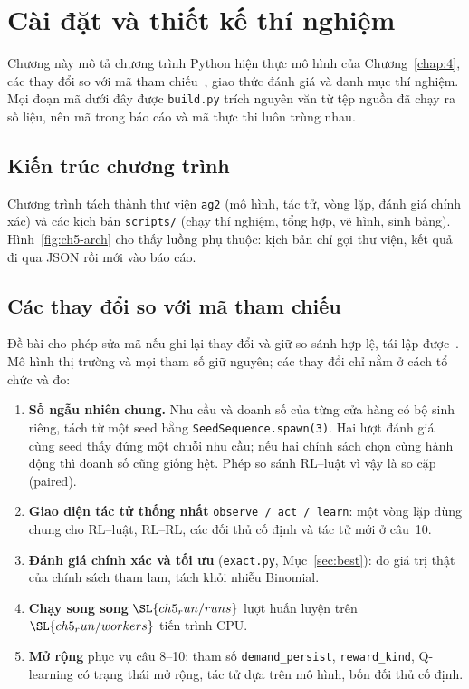 \chapter{Cài đặt và thiết kế thí nghiệm}\label{chap:5}

Chương này mô tả chương trình Python hiện thực mô hình của Chương~\ref{chap:4}, các thay đổi so với mã tham
chiếu~\cite{lab02code}, giao thức đánh giá và danh mục thí nghiệm. Mọi đoạn mã dưới đây được \texttt{build.py} trích
nguyên văn từ tệp nguồn đã chạy ra số liệu, nên mã trong báo cáo và mã thực thi luôn trùng nhau.

\section{Kiến trúc chương trình}

Chương trình tách thành thư viện \texttt{ag2} (mô hình, tác tử, vòng lặp, đánh giá chính xác) và các kịch bản
\texttt{scripts/} (chạy thí nghiệm, tổng hợp, vẽ hình, sinh bảng). Hình~\ref{fig:ch5-arch} cho thấy luồng phụ thuộc:
kịch bản chỉ gọi thư viện, kết quả đi qua JSON rồi mới vào báo cáo.


\section{Các thay đổi so với mã tham chiếu}

Đề bài cho phép sửa mã nếu ghi lại thay đổi và giữ so sánh hợp lệ, tái lập được~\cite{lab02}. Mô hình thị trường và
mọi tham số giữ nguyên; các thay đổi chỉ nằm ở cách tổ chức và đo:
\begin{enumerate}
  \item[\textbf{M1.}] \textbf{Số ngẫu nhiên chung.} Nhu cầu và doanh số của từng cửa hàng có bộ sinh riêng, tách từ một seed
    bằng \texttt{SeedSequence.spawn(3)}. Hai lượt đánh giá cùng seed thấy đúng một chuỗi nhu cầu; nếu hai chính sách chọn
    cùng hành động thì doanh số cũng giống hệt. Phép so sánh RL--luật vì vậy là so cặp (paired).
  \item[\textbf{M2.}] \textbf{Giao diện tác tử thống nhất} \texttt{observe / act / learn}: một vòng lặp dùng chung cho
    RL--luật, RL--RL, các đối thủ cố định và tác tử mới ở câu~10.
  \item[\textbf{M3.}] \textbf{Đánh giá chính xác và tối ưu} (\texttt{exact.py}, Mục~\ref{sec:best}): đo giá trị thật của
    chính sách tham lam, tách khỏi nhiễu Binomial.
  \item[\textbf{M4.}] \textbf{Chạy song song} $\SL{ch5_run/runs}$ lượt huấn luyện trên $\SL{ch5_run/workers}$ tiến trình CPU.
  \item[\textbf{M5.}] \textbf{Mở rộng} phục vụ câu 8--10: tham số \texttt{demand\_persist}, \texttt{reward\_kind},
    Q-learning có trạng thái mở rộng, tác tử dựa trên mô hình, bốn đối thủ cố định.
\end{enumerate}

